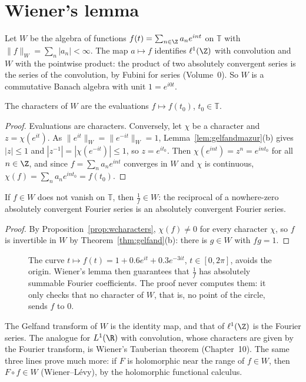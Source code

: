 \section{Wiener's lemma}

Let $W$ be the algebra of functions $f(t)=\sum_{n\in\Z}a_ne^{int}$ on $\mathbb T$ with $\|f\|_W=\sum_n|a_n|<\infty$. The map $a\mapsto f$ identifies $\ell^1(\Z)$ with convolution and $W$ with the pointwise product: the product of two
absolutely convergent series is the series of the convolution, by Fubini for series (Volume~0). So $W$ is a commutative Banach algebra with unit $1=e^{i0t}$.

\begin{proposition}\label{prop:wcharacters}
The characters of $W$ are the evaluations $f\mapsto f(t_0)$, $t_0\in\mathbb T$.
\end{proposition}
\begin{proof}
Evaluations are characters. Conversely, let $\chi$ be a character and $z=\chi(e^{it})$. As $\|e^{it}\|_W=\|e^{-it}\|_W=1$, Lemma~\ref{lem:gelfandmazur}(b) gives $|z|\le1$ and $|z^{-1}|=|\chi(e^{-it})|\le1$, so $z=e^{it_0}$. Then
$\chi(e^{int})=z^n=e^{int_0}$ for all $n\in\Z$, and since $f=\sum_na_ne^{int}$ converges in $W$ and $\chi$ is continuous, $\chi(f)=\sum_na_ne^{int_0}=f(t_0)$.
\end{proof}

\begin{theorem}\label{thm:wiener}
If $f\in W$ does not vanish on $\mathbb T$, then $\frac1f\in W$: the reciprocal of a nowhere-zero absolutely convergent Fourier series is an absolutely convergent Fourier series.
\end{theorem}
\begin{proof}
By Proposition~\ref{prop:wcharacters}, $\chi(f)\ne0$ for every character $\chi$, so $f$ is invertible in $W$ by Theorem~\ref{thm:gelfand}(b): there is $g\in W$ with $fg=1$.
\end{proof}

\begin{figure}[ht]
\centering
{}
\caption{The curve $t\mapsto f(t)=1+0.6e^{it}+0.3e^{-3it}$, $t\in[0,2\pi]$, avoids the origin. Wiener's lemma then guarantees that $\frac1f$ has absolutely summable Fourier coefficients. The proof never computes them: it only checks
that no character of $W$, that is, no point of the circle, sends $f$ to $0$.}
\label{fig:wiener}
\end{figure}

The Gelfand transform of $W$ is the identity map, and that of $\ell^1(\Z)$ is the Fourier series. The analogue for $L^1(\R)$ with convolution, whose characters are given by the Fourier transform, is Wiener's Tauberian theorem
(Chapter~10). The same three lines prove much more: if $F$ is holomorphic near the range of $f\in W$, then $F\circ f\in W$ (Wiener--L\'evy), by the holomorphic functional calculus.

